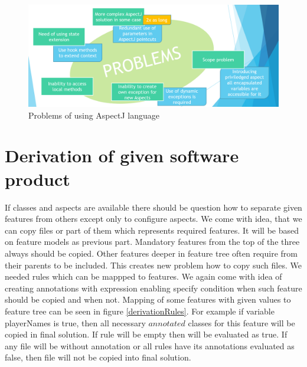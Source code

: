 \documentclass[11pt,english,a4paper,twoside]{article}
\begin{document}
\begin{figure}[H]  %
					\begin{center}
									\includegraphics[width=\linewidth]{fig/problemsOfAspectJEN.png}
									\caption{Problems of using AspectJ language}
									\label{problemsOfAspectJ}
					\end{center}
\end{figure}



\section{Derivation of given software product} \label{gameDerivation}

If classes and aspects are available there should be question how to separate given features from others except only to configure aspects. We come with idea, that we can copy files or part of them which represents required features. It will be based on feature models as previous part. Mandatory features from the top of the three always should be copied. Other features deeper in feature tree often require from their parents to be included. This creates new problem how to copy such files. We needed rules which can be mappped to features. We again come with idea of creating annotations with expression enabling specify condition when such feature should be copied and when not. Mapping of some features with given values to feature tree can be seen in figure \ref{derivationRules}. For example if variable playerNames is true, then all necessary \(annotated\) classes for this feature will be copied in final solution. If rule will be empty then will be evaluated as true. If any file will be without annotation or all rules have its annotations evaluated as false, then file will not be copied into final solution.
\end{document}
